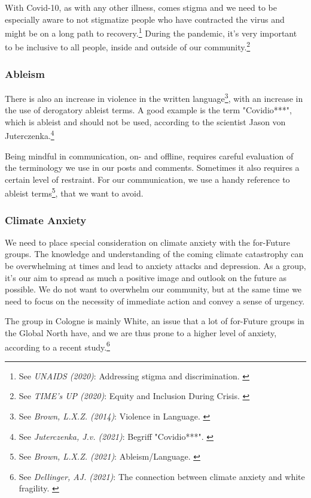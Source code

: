 With Covid-10, as with any other illness, comes stigma and we need to be especially aware to not stigmatize people who have contracted the virus and might be on a long path to recovery.\footnote{See \textit{UNAIDS (2020)}: Addressing stigma and discrimination. \cite{addressingStigma}} During the pandemic, it's very important to be inclusive to all people, inside and outside of our community.\footnote{See \textit{TIME's UP (2020)}: Equity and Inclusion During Crisis. \cite{equityInclusion}}

\subsubsection{Ableism}

There is also an increase in violence in the written language\footnote{See \textit{Brown, L.X.Z. (2014)}: Violence in Language. \cite{violenceLanguage}}, with an increase in the use of derogatory ableist terms. A good example is the term "Covidio***", which is ableist and should not be used, according to the scientist Jason von Juterczenka.\footnote{See \textit{Juterczenka, J.v. (2021)}: Begriff "Covidio***". \cite{covidioXXX}}

Being mindful in communication, on- and offline, requires careful evaluation of the terminology we use in our posts and comments. Sometimes it also requires a certain level of restraint. For our communication, we use a handy reference to ableist terms\footnote{See \textit{Brown, L.X.Z. (2021)}: Ableism/Language. \cite{ableismLanguage}}, that we want to avoid.

\subsubsection{Climate Anxiety}

We need to place special consideration on climate anxiety with the for-Future groups. The knowledge and understanding of the coming climate catastrophy can be overwhelming at times and lead to anxiety attacks and depression. As a group, it's our aim to spread as much a positive image and outlook on the future as possible. We do not want to overwhelm our community, but at the same time we need to focus on the necessity of immediate action and convey a sense of urgency.

The group in Cologne is mainly White, an issue that a lot of for-Future groups in the Global North have, and we are thus prone to a higher level of anxiety, according to a recent study.\footnote{See \textit{Dellinger, AJ. (2021)}: The connection between climate anxiety and white fragility. \cite{climateAnxiety}}

